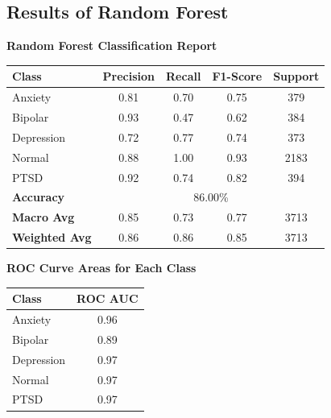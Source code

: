 \pagebreak

\subsection{Results of Random Forest}

\begin{center}
    \textbf{Random Forest Classification Report} \\[0.5em]
    \begin{tabular}{|l|c|c|c|c|}
        \hline
        \textbf{Class} & \textbf{Precision} & \textbf{Recall} & \textbf{F1-Score} & \textbf{Support} \\ \hline
        Anxiety        & 0.81               & 0.70            & 0.75              & 379              \\ \hline
        Bipolar        & 0.93               & 0.47            & 0.62              & 384              \\ \hline
        Depression     & 0.72               & 0.77            & 0.74              & 373              \\ \hline
        Normal         & 0.88               & 1.00            & 0.93              & 2183             \\ \hline
        PTSD           & 0.92               & 0.74            & 0.82              & 394              \\ \hline
        \textbf{Accuracy} & \multicolumn{4}{|c|}{86.00\%} \\ \hline
        \textbf{Macro Avg} & 0.85            & 0.73            & 0.77              & 3713             \\ \hline
        \textbf{Weighted Avg} & 0.86         & 0.86            & 0.85              & 3713             \\ \hline
    \end{tabular}
\end{center}

\vspace{0.25em}

\begin{center}
    \textbf{ROC Curve Areas for Each Class} \\[0.5em]
    \begin{tabular}{|l|c|}
        \hline
        \textbf{Class}  & \textbf{ROC AUC} \\ \hline
        Anxiety         & 0.96            \\ \hline
        Bipolar         & 0.89            \\ \hline
        Depression      & 0.97            \\ \hline
        Normal          & 0.97            \\ \hline
        PTSD            & 0.97            \\ \hline
    \end{tabular}
\end{center}

